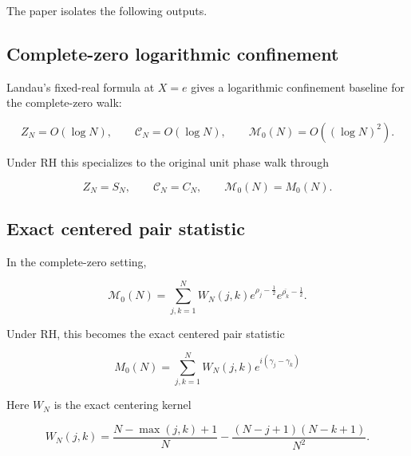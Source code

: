 \documentclass[11pt]{amsart}
\numberwithin{equation}{section}
\theoremstyle{plain}
\theoremstyle{definition}
\theoremstyle{remark}
\begin{document}
The paper isolates the following outputs.

\subsection{Complete-zero logarithmic confinement}
\label{subsec:conclusion_complete_zero_confinement}
\leavevmode\par\nobreak

Landau's fixed-real formula at \(X=e\) gives a logarithmic confinement
baseline for the complete-zero walk:

\begin{equation}
Z_N=O(\log N),
\qquad
\mathcal C_N=O(\log N),
\qquad
\mathcal M_0(N)=O\!\left((\log N)^2\right).
\label{eq:conclusion_complete_zero_bounds}
\end{equation}

Under RH this specializes to the original unit phase walk through

\begin{equation}
Z_N=S_N,
\qquad
\mathcal C_N=C_N,
\qquad
\mathcal M_0(N)=M_0(N).
\label{eq:conclusion_RH_specialized_objects}
\end{equation}

\subsection{Exact centered pair statistic}
\label{subsec:conclusion_exact_pair_statistic}
\leavevmode\par\nobreak

In the complete-zero setting,

\begin{equation}
\mathcal M_0(N)
=
\sum_{j,k=1}^{N}
W_N(j,k)
e^{\rho_j-\frac12}
e^{\overline{\rho_k}-\frac12}.
\label{eq:conclusion_complete_zero_pair_statistic}
\end{equation}

Under RH, this becomes the exact centered pair statistic

\begin{equation}
M_0(N)
=
\sum_{j,k=1}^{N}
W_N(j,k)e^{i(\gamma_j-\gamma_k)}
\label{eq:conclusion_RH_exact_pair_statistic}
\end{equation}

Here \(W_N\) is the exact centering kernel

\begin{equation}
W_N(j,k)
=
\frac{N-\max(j,k)+1}{N}
-
\frac{(N-j+1)(N-k+1)}{N^2}.
\label{eq:conclusion_WN_definition}
\end{equation}
\end{document}
